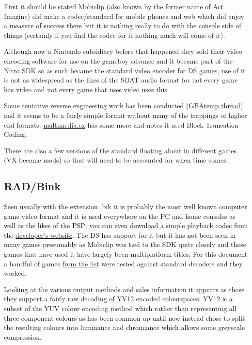 \documentclass[
]{book}
\begin{document}
First it should be stated Mobiclip (also known by the former name of Act Imagine) did make a codec/standard for mobile phones and web which did enjoy a measure of success there but it is nothing really to do with the console side of things (certainly if you find the codec for it nothing much will come of it).

Although now a Nintendo subsidiary before that happened they sold their video encoding software for use on the gameboy advance and it became part of the Nitro SDK so as such became the standard video encoder for DS games, use of it is not as widespread as the likes of the SDAT audio format for not every game has video and not every game that uses video uses this.

Some tentative reverse engineering work has been conducted (\href{http://gbatemp.net/topic/125374-player-of-vx-file/page__view__findpost__p__3830983}{GBAtemp thread}) and it seems to be a fairly simple format without many of the trappings of higher end formats. \href{http://wiki.multimedia.cx/index.php?title=Mobiclip_Video_Codec}{multimedia.cx} has some more and notes it used Block Truncation Coding.

There are also a few versions of the standard floating about in different games (VX became mods) so that will need to be accounted for when time comes.

\hypertarget{radbink}{%
\subsection{RAD/Bink}\label{radbink}}

Seen usually with the extension .bik it is probably the most well known computer game video format and it is used everywhere on the PC and home consoles as well as the likes of the PSP; you can even download a simple playback codec from the \href{http://www.radgametools.com/bnkdown.htm}{developer's website}. The DS has support for it but it has not been seen in many games presumably as Mobiclip was tied to the SDK quite closely and those games that have used it have largely been multiplatform titles. For this document a handful of games \href{http://www.radgametools.com/binkgames.htm\#games}{from the list} were tested against standard decoders and they worked.

Looking at the various output methods and sales information it appears as those they support a fairly raw decoding of YV12 encoded colourspaces; YV12 is a subset of the YUV colour encoding method which rather than representing all three component colours as has been common up until now instead chose to split the resulting colours into luminance and chromiance which allows some greyscale compression.
\end{document}
